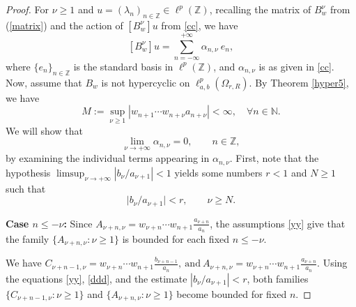 \documentclass[12pt, reqno]{amsart}
\theoremstyle{definition}
\theoremstyle{remark}
\numberwithin{equation}{section}
\begin{document}
\begin{proof}
 For $\nu\geq 1$ and $u=(\lambda_{n})_{n\in \mathbb{Z}}\in \ell^{p}(\mathbb{Z})$, recalling the matrix of $B_{w}^{\nu}$ from (\ref{matrix}) and the action of $[B_{w}^{\nu}]u$ from \eqref{cc}, we have
\begin{equation}\label{ccc}
   [B_{w}^{\nu}]u=\sum_{n=-\infty}^{+\infty} \alpha_{n,\nu} ~ e_{n},
\end{equation}
where $\{e_{n}\}_{n\in \mathbb{Z}}$ is the standard basis in $\ell^p(\mathbb{Z})$, and 
$\alpha_{n,\nu}$ is as given in \eqref{cc}.
Now, assume that $B_{w}$ is not hypercyclic on $\ell^p_{a,b}(\Omega_{r,R})$. By Theorem \ref{hyper5}, we have 
\begin{equation}\label{ddd}
M:=\sup_{\nu\geq 1}\left|w_{n+1}\cdots w_{n+\nu}{a_{n+\nu}}\right|<\infty,\quad\forall n\in \mathbb{N}.
\end{equation}
We will show that 
\[
\lim_{\nu\to+\infty}\alpha_{n,\nu}=0 , \qquad n\in\mathbb{Z},
\]
by examining the individual terms appearing in $\alpha_{n,\nu}$. First, note that the hypothesis $\limsup_{\nu\to+\infty}|b_\nu/a_{\nu+1}|<1$ yields some numbers $r<1$ and $N\geq 1$ such that  
\begin{equation}\label{dd}
\big|b_\nu/a_{\nu+1}\big|<r, \qquad \nu\geq N.
\end{equation}

\noindent \textbf{Case $n\le -\nu$:} Since $A_{\nu+n,\nu}
=w_{\nu+n}\cdots w_{n+1}\frac{a_{\nu+n}}{a_{n}}$, the assumptions \eqref{yy} give that the family $\{A_{\nu+n,\nu}:\nu\ge 1\}$ is bounded for each fixed $n\le -\nu$.

We have
$
C_{\nu+n-1,\nu}
   = w_{\nu+n}\cdots w_{n+1} \frac{b_{\nu+n-1}}{a_{n}},
~\text{and}~
A_{\nu+n,\nu}=
   w_{\nu+n}\cdots w_{n+1}\frac{a_{\nu+n}}{a_{n}}.
$
Using the equations \eqref{yy}, \eqref{ddd}, and the estimate 
$|b_\nu/a_{\nu+1}|<r$, both families
$
\{C_{\nu+n-1,\nu}:\nu\ge 1\}$ and 
$\{A_{\nu+n,\nu}:\nu\ge 1\}
$
become bounded for fixed $n$.


\end{proof}
\end{document}
